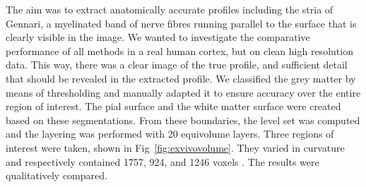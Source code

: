 The aim was to extract anatomically accurate profiles including the stria of Gennari, a myelinated band of nerve fibres running parallel to the surface that is clearly visible in the image. We wanted to investigate the comparative performance of all methods in a real human cortex, but on clean high resolution data. This way, there was a clear image of the true profile, and sufficient detail that should be revealed in the extracted profile. We classified the grey matter by means of thresholding and manually adapted it to ensure accuracy over the entire region of interest. The pial surface and the white matter surface were created based on these segmentations. From these boundaries, the level set was computed and the layering was performed with 20 equivolume layers. 
 Three regions of interest were taken, shown in Fig~\ref{fig:exvivovolume}. They varied in curvature and respectively contained 1757, 924, and 1246 voxels . The results were qualitatively compared. 

